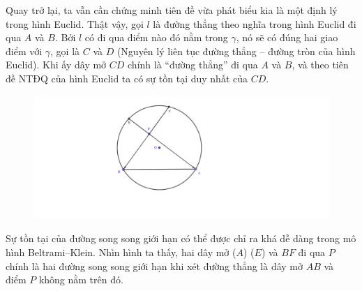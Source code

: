 \begin{multicols}{2}
	Quay trở lại, ta vẫn cần chứng minh tiên đề vừa phát biểu kia là một định lý trong hình Euclid.
	Thật vậy, gọi $l$ là đường thẳng theo nghĩa trong hình Euclid đi qua $A$ và $B$. Bởi $l$ có đi qua điểm nào đó nằm trong $\gamma$, nó sẽ có đúng hai giao điểm với $\gamma$, gọi là $C$ và $D$ (Nguyên lý liên tục đường thẳng -- đường tròn của hình Euclid). Khi ấy dây mở $CD$ chính là ``đường thẳng'' đi qua $A$ và $B$, và theo tiên đề NTĐQ của hình Euclid ta có sự tồn tại duy nhất của $CD$.
	\begin{figure}[H]
		\vspace*{-10pt}
		\centering
		\captionsetup{labelformat= empty, justification=centering}
		\includegraphics[width= 0.85\linewidth]{Duong_song_song_gioi_han_Klein.pdf}
		\vspace*{-15pt}
	\end{figure}
	Sự tồn tại của  đường song song giới hạn có thể được chỉ ra khá dễ dàng trong mô hình Beltrami--Klein. Nhìn hình ta thấy, hai dây mở ($A$) ($E$) và $BF$ đi qua $P$ chính là hai đường song song giới hạn khi xét đường thẳng là dây mở $AB$ và điểm $P$ không nằm trên đó.
	
\end{multicols}